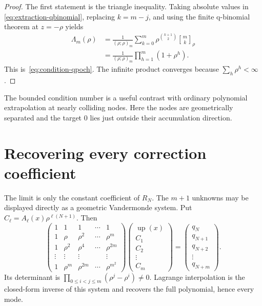 \documentclass[11pt,a4paper]{article}
\theoremstyle{remark}
\newcommand{\up}{\operatorname{up}}
\newcommand{\qbinom}[3]{\genfrac{[}{]}{0pt}{}{#1}{#2}_{#3}}
\begin{document}
\begin{proof}
The first statement is the triangle inequality.  Taking absolute values in
\eqref{eq:extraction-qbinomial}, replacing $k=m-j$, and using the finite
q-binomial theorem at $z=-\rho$ yields
\begin{align*}
 \Lambda_m(\rho)
 &=\frac1{(\rho;\rho)_m}
   \sum_{k=0}^{m}\rho^{\binom{k+1}{2}}
   \qbinom{m}{k}{\rho}\\
 &=\frac1{(\rho;\rho)_m}
   \prod_{h=1}^{m}(1+\rho^h).
\end{align*}
This is~\eqref{eq:condition-qpoch}.  The infinite product converges because
$\sum_h\rho^h<\infty$.
\end{proof}

The bounded condition number is a useful contrast with ordinary polynomial
extrapolation at nearly colliding nodes.  Here the nodes are geometrically
separated and the target $0$ lies just outside their accumulation direction.

\section{Recovering every correction coefficient}
\label{sec:all-coefficients}

The limit is only the constant coefficient of $R_N$.  The $m+1$ unknowns may
be displayed directly as a geometric Vandermonde system.  Put
$C_\ell=A_\ell(x)\rho^{\ell(N+1)}$.  Then
\begin{equation}
 \begin{pmatrix}
  1&1&1&\cdots&1\\
  1&\rho&\rho^2&\cdots&\rho^m\\
  1&\rho^2&\rho^4&\cdots&\rho^{2m}\\
  \vdots&\vdots&\vdots&&\vdots\\
  1&\rho^m&\rho^{2m}&\cdots&\rho^{m^2}
 \end{pmatrix}
 \begin{pmatrix}\up(x)\\C_1\\C_2\\\vdots\\C_m\end{pmatrix}
 =\begin{pmatrix}q_N\\q_{N+1}\\q_{N+2}\\\vdots\\q_{N+m}\end{pmatrix}.
 \label{eq:geometric-vandermonde-system}
\end{equation}
Its determinant is
$\prod_{0\le i<j\le m}(\rho^j-\rho^i)\ne0$.  Lagrange interpolation is the
closed-form inverse of this system and recovers the full polynomial, hence
every mode.
\end{document}
